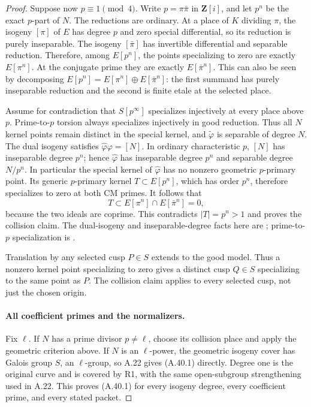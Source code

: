 \begin{proof}
Suppose now \(p\equiv1\pmod4\). Write
\(p=\pi\bar\pi\) in \(\mathbf Z[i]\), and let
\(p^n\) be the exact \(p\)-part of \(N\).
The reductions are ordinary. At a place of \(K\)
dividing \(\pi\), the isogeny \([\pi]\) of \(E\)
has degree \(p\) and zero special differential, so
its reduction is purely inseparable. The isogeny
\([\bar\pi]\) has invertible differential and
separable reduction. Therefore, among
\(E[p^n]\), the points specializing to zero are
exactly \(E[\pi^n]\). At the conjugate prime they
are exactly \(E[\bar\pi^n]\). This can also be
seen by decomposing
\(E[p^n]=E[\pi^n]\oplus E[\bar\pi^n]\): the
first summand has purely inseparable reduction and
the second is finite etale at the selected place.

Assume for contradiction that \(S[p^\infty]\)
specializes injectively at every place above \(p\).
Prime-to-\(p\) torsion always specializes injectively
in good reduction. Thus all \(N\) kernel points
remain distinct in the special kernel, and
\(\widetilde\varphi\) is separable of degree \(N\).
The dual isogeny satisfies
\(\widehat\varphi\varphi=[N]\). In ordinary
characteristic \(p\), \([N]\) has inseparable
degree \(p^n\); hence \(\widehat\varphi\) has
inseparable degree \(p^n\) and separable degree
\(N/p^n\). In particular the special kernel of
\(\widehat\varphi\) has no nonzero geometric
\(p\)-primary point. Its generic \(p\)-primary
kernel \(T\subset E[p^n]\), which has order
\(p^n\), therefore specializes to zero at both
CM primes. It follows that
\[
                  T\subset E[\pi^n]\cap E[\bar\pi^n]=0,
\]
because the two ideals are coprime. This contradicts
\(|T|=p^n>1\) and proves the collision claim.
The dual-isogeny and inseparable-degree facts here
are \cite[Theorem III.6.1, Corollary III.6.4,
Theorem V.3.1]{fghSilvermanAEC}; prime-to-\(p\)
specialization is \cite[Proposition VII.3.1(b)]{fghSilvermanAEC}.

Translation by any selected cusp \(P\in S\)
extends to the good model. Thus a nonzero kernel
point specializing to zero gives a distinct cusp
\(Q\in S\) specializing to the same point as
\(P\). The collision claim applies to every
selected cusp, not just the chosen origin.

\paragraph{All coefficient primes and the normalizers.}
Fix \(\ell\). If \(N\) has a prime divisor
\(p\ne\ell\), choose its collision place and
apply the geometric criterion above. If \(N\)
is an \(\ell\)-power, the geometric isogeny
cover has Galois group \(S\), an \(\ell\)-group,
so A.22 gives (A.40.1) directly. Degree one is
the original curve and is covered by R1, with
the same open-subgroup strengthening used in A.22.
This proves (A.40.1) for every isogeny degree,
every coefficient prime, and every stated packet.


\end{proof}

